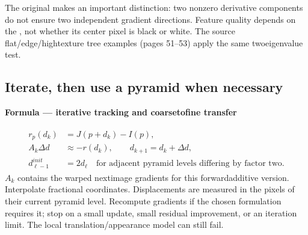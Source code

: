 \documentclass[letterpaper,11pt,english,openany,oneside]{jupyterBook}
\begin{document}
\sphinxAtStartPar
The original {\hyperref[\detokenize{lectures/lecture05/quiz-workbook:quiz-13-q1}]{}} makes an important distinction: two nonzero derivative components do not ensure two independent gradient directions. Feature quality depends on the , not whether its center pixel is black or white. The source flat/edge/high\sphinxhyphen{}texture tree examples (pages 51–53) apply the same two\sphinxhyphen{}eigenvalue test.


\subsection{Iterate, then use a pyramid when necessary}
\label{\detokenize{lectures/lecture05/tracking:iterate-then-use-a-pyramid-when-necessary}}
\begin{TextbookBox}
\textbf{Formula — iterative tracking and coarse\sphinxhyphen{}to\sphinxhyphen{}fine transfer}\par\smallskip
\begin{equation}\label{equation:lectures/lecture05/tracking:eq-lec05-iteration}
\begin{split}\begin{aligned}
r_p(d_k)&=J(p+d_k)-I(p),\\
A_k\Delta d&\approx-r(d_k),\qquad d_{k+1}=d_k+\Delta d,\\
d_{\ell-1}^{init}&=2d_\ell
\quad\text{for adjacent pyramid levels differing by factor two}.
\end{aligned}\end{split}
\end{equation}
\sphinxAtStartPar
\(A_k\) contains the warped next\sphinxhyphen{}image gradients for this forward\sphinxhyphen{}additive version. Interpolate fractional coordinates. Displacements are measured in the pixels of their current pyramid level. Recompute gradients if the chosen formulation requires it; stop on a small update, small residual improvement, or an iteration limit. The local translation/appearance model can still fail.

\end{TextbookBox}
\end{document}
